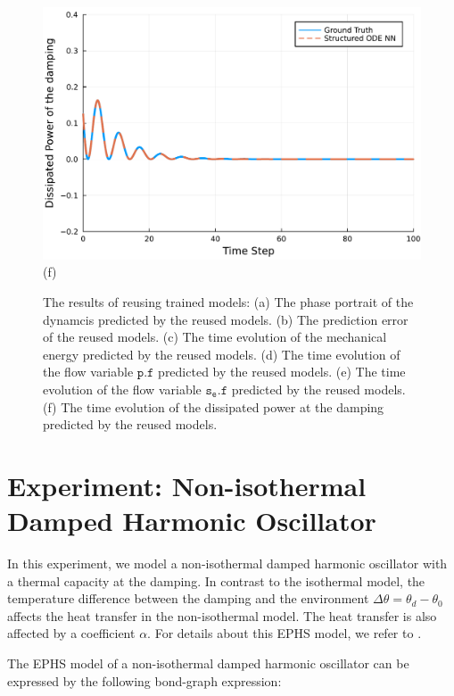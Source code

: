 \documentclass[
	parskip, 			   %
	twoside, 			   %
	DIV=14, 			   %
	BCOR=15.0mm, 		   %
	headsepline, 		   %
	open=right, 		   %
	captions=tableheading, %
	bibliography=totoc,    %
	numbers=noenddot       %
]{scrreprt}
\begin{document}
\begin{figure}[h!]
\begin{minipage}{.3\textwidth}
    \includegraphics[width=1\linewidth]{figures/dissipated_power_damping_idho_reuse.pdf}
    \\(f)
    \end{minipage}
    \label{fig:idho_reuse}
    \caption{The results of reusing trained models: (a) The phase portrait of the dynamcis predicted by the reused models. (b) The prediction error of the reused models. (c) The time evolution of the mechanical energy predicted by the reused models. (d) The time evolution of the flow variable $\mathtt{p.f}$ predicted by the reused models. (e) The time evolution of the flow variable $\mathtt{s_e.f}$ predicted by the reused models. (f) The time evolution of the dissipated power at the damping predicted by the reused models.}
\end{figure}


\clearpage
\section{Experiment: Non-isothermal Damped Harmonic Oscillator}
In this experiment, we model a non-isothermal damped harmonic oscillator with a thermal capacity at the damping. In contrast to the isothermal model, the temperature difference between the damping and the environment $\Delta\theta = \theta_d - \theta_0$ affects the heat transfer in the non-isothermal model. The heat transfer is also affected by a coefficient $\alpha$. For details about this EPHS model, we refer to \cite{lohmayer2021exergetic}.

The EPHS model of a non-isothermal damped harmonic oscillator can be expressed by  the following bond-graph expression: 
\end{document}
